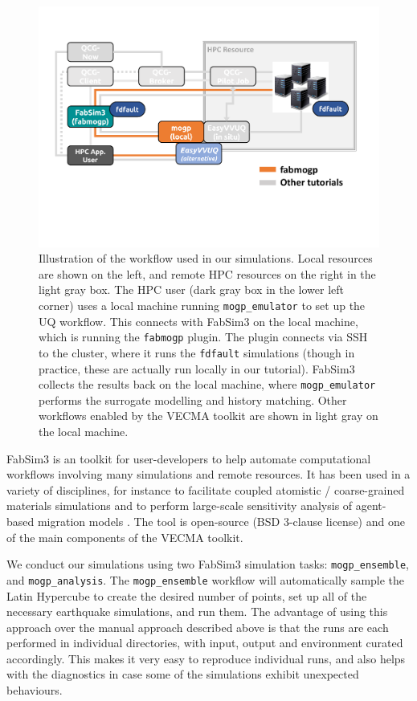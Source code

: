\documentclass[openacc]{rstransa}%
\begin{document}
\begin{figure}[!h]
\centering\includegraphics[width=5in]{FabMogpMap.pdf}
\caption{Illustration of the workflow used in our simulations. Local resources are shown on the
left, and remote HPC resources on the right in the light gray box. The HPC user (dark gray box in
the lower left corner) uses a local machine running \texttt{mogp\_emulator} to set up the
UQ workflow. This connects with FabSim3 on the local machine, which is running the
\texttt{fabmogp} plugin. The plugin
connects via SSH to the cluster, where it runs the \texttt{fdfault} simulations (though
in practice, these are actually run locally in our tutorial). FabSim3 collects the results
back on the local machine, where \texttt{mogp\_emulator} performs the surrogate modelling
and history matching.
Other workflows enabled by the VECMA toolkit are shown in light gray on the local machine.}
\label{tubemap}
\end{figure}

FabSim3 is an toolkit for user-developers to help automate computational workflows involving many simulations and remote resources. It has been used in a variety of disciplines, for instance to facilitate coupled atomistic / coarse-grained materials simulations and to perform large-scale sensitivity analysis of agent-based migration models \cite{fabsim}. The tool is open-source (BSD 3-clause license) and one of the main components of the VECMA toolkit.

We conduct our simulations using two FabSim3 simulation tasks: \texttt{mogp\_ensemble}, and
\texttt{mogp\_analysis}.
The \texttt{mogp\_ensemble} workflow will automatically sample the Latin Hypercube to create the desired number of points, set up all of the necessary earthquake simulations, and run them. The advantage of using this approach over the manual approach described above is that the runs are each performed in individual directories, with input, output and environment curated accordingly. This makes it very easy to reproduce individual runs, and also helps with the diagnostics in case some of the simulations exhibit unexpected behaviours.
\end{document}
